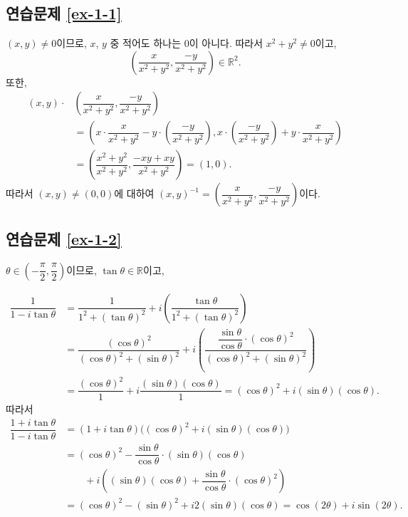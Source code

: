 \subsection*{연습문제 \ref{ex-1-1}}

$(x,y) \ne 0$이므로, 
$x$, $y$ 중 적어도 하나는 $0$이 아니다.
따라서 $x^2+y^2\ne 0$이고,
\[
\left( \dfrac x{x^2+y^2}, \dfrac{-y}{x^2+y^2} \right) \in \mathbb R^2.
\]
또한,
\begin{align*}
(x,y) \cdot & \left( \dfrac x{x^2+y^2}, \dfrac{-y}{x^2+y^2} \right) \\
&=\left( x\cdot \dfrac x{x^2+y^2} - y\cdot \left( \dfrac{-y}{x^2+y^2} \right),
x\cdot \left(\dfrac{-y}{x^2+y^2}\right) + y\cdot  \dfrac{x}{x^2+y^2} \right) \\
&= \left( \dfrac{x^2+y^2}{x^2+y^2}, \dfrac{-xy + xy}{x^2+y^2} \right) = (1,0).
\end{align*}
따라서 $(x,y) \ne(0,0)$에 대하여
$
(x,y)^{-1} = \left(\dfrac x{x^2+y^2}, \dfrac{-y}{x^2+y^2} \right)
$이다.

\subsection*{연습문제 \ref{ex-1-2}}

$\theta \in \left(-\dfrac{\pi}2, \dfrac\pi2 \right)$이므로,
$\tan \theta \in \mathbb R$이고,

\begin{align*}
\dfrac1{1-i\tan\theta}
&= \dfrac1{1^2+(\tan\theta)^2} 
+ i\left( \dfrac{\tan\theta}{1^2 + (\tan\theta)^2} \right) \\
&= \dfrac{(\cos\theta)^2}{(\cos\theta)^2 + (\sin\theta)^2}
+ i\left( \dfrac{\dfrac{\sin\theta}{\cos\theta}\cdot(\cos\theta)^2}
{(\cos\theta)^2 + (\sin\theta)^2} \right) \\
&= \dfrac{(\cos\theta)^2}1 + i \dfrac{(\sin\theta)(\cos\theta)}1
= (\cos\theta)^2 + i(\sin\theta)(\cos\theta).
\end{align*}
따라서
\begin{align*}
\dfrac{1+i\tan\theta}{1-i\tan\theta}
&= (1+i\tan\theta) \Big( (\cos\theta)^2 + i(\sin\theta)(\cos\theta) \Big) \\
&= (\cos\theta)^2 - \dfrac{\sin\theta}{\cos\theta} \cdot
(\sin\theta)(\cos\theta) \\
&\quad\quad + i \left(
(\sin\theta)(\cos\theta) + \dfrac{\sin\theta}{\cos\theta} \cdot (\cos\theta)^2
\right) \\
&= (\cos\theta)^2 - (\sin\theta)^2 + i2(\sin\theta)(\cos\theta)
= \cos(2\theta) + i\sin(2\theta).
\end{align*}

